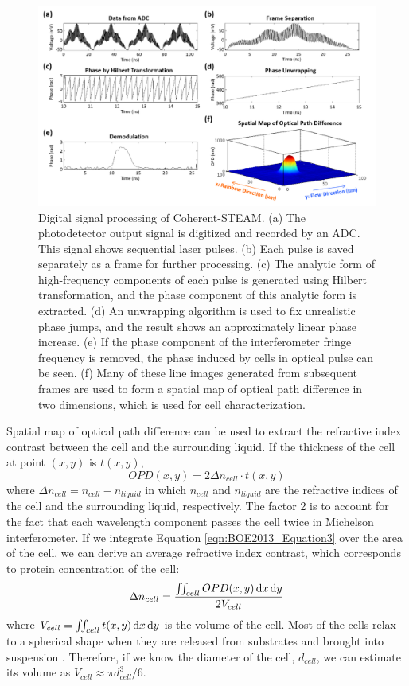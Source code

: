 \begin{figure}[htb!]
\centering
\includegraphics[scale=1]{BOE2013/Figure2.png}
\caption{Digital signal processing of Coherent-STEAM. (a) The photodetector output signal is digitized and recorded by an ADC. This signal shows sequential laser pulses. (b) Each pulse is saved separately as a frame for further processing. (c) The analytic form of high-frequency components of each pulse is generated using Hilbert transformation, and the phase component of this analytic form is extracted. (d) An unwrapping algorithm is used to fix unrealistic phase jumps, and the result shows an approximately linear phase increase. (e) If the phase component of the interferometer fringe frequency is removed, the phase induced by cells in optical pulse can be seen. (f) Many of these line images generated from subsequent frames are used to form a spatial map of optical path difference in two dimensions, which is used for cell characterization.}
\label{fig:BOE2013_Figure2}
\end{figure}

Spatial map of optical path difference can be used to extract the refractive index contrast between the cell and the surrounding liquid.  If the thickness of the cell at point $(x,y)$ is $t(x,y)$,
\begin{equation}
OPD(x,y) = 2 \Delta n_{cell} \cdot t(x,y)
\label{eqn:BOE2013_Equation3}
\end{equation}
where $\Delta n_{cell} = n_{cell} - n_{liquid}$ in which $n_{cell}$ and $n_{liquid}$ are the refractive indices of the cell and the surrounding liquid, respectively. The factor 2 is to account for the fact that each wavelength component passes the cell twice in Michelson interferometer. If we integrate Equation \eqref{eqn:BOE2013_Equation3} over the area of the cell, we can derive an average refractive index contrast, which corresponds to protein concentration of the cell:
\begin{equation}
\Delta n_{cell} = \frac{\iint_{cell} OPD(x,y) \,\mathrm{d} x \,\mathrm{d} y}{2V_{cell}}
\label{eqn:BOE2013_Equation4}
\end{equation}
where $V_{cell} = \iint_{cell} t(x,y) \,\mathrm{d} x \,\mathrm{d} y$ is the volume of the cell. Most of the cells relax to a spherical shape when they are released from substrates and brought into suspension \cite{revel1974adhesion,whur1977substrate}. Therefore, if we know the diameter of the cell, $d_{cell}$, we can estimate its volume as $V_{cell} \approx \pi d_{cell}^3/6$.

